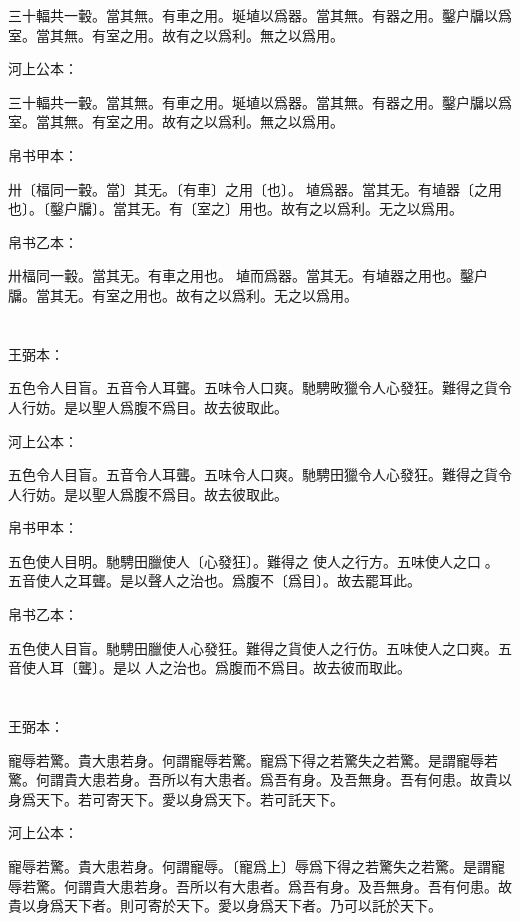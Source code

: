 \documentclass[a5paper]{ctexbook}
\begin{document}
    三十輻共一轂。當其無。有車之用。埏埴以爲器。當其無。有器之用。鑿户牖以爲室。當其無。有室之用。故有之以爲利。無之以爲用。

    河上公本：

    三十輻共一轂。當其無。有車之用。埏埴以爲器。當其無。有器之用。鑿户牖以爲室。當其無。有室之用。故有之以爲利。無之以爲用。

    帛书甲本：

    卅〔楅同一轂。當〕其无。〔有車〕之用〔也〕。𡑋埴爲器。當其无。有埴器〔之用也〕。〔鑿户牖〕。當其无。有〔室之〕用也。故有之以爲利。无之以爲用。

    帛书乙本：

    卅楅同一轂。當其无。有車之用也。𡑋埴而爲器。當其无。有埴器之用也。鑿户牖。當其无。有室之用也。故有之以爲利。无之以爲用。

    \chapter{}
    王弼本：

    五色令人目盲。五音令人耳聾。五味令人口爽。馳騁畋獵令人心發狂。難得之貨令人行妨。是以聖人爲腹不爲目。故去彼取此。

    河上公本：

    五色令人目盲。五音令人耳聾。五味令人口爽。馳騁田獵令人心發狂。難得之貨令人行妨。是以聖人爲腹不爲目。故去彼取此。

    帛书甲本：

    五色使人目明。馳騁田臘使人〔心發狂〕。難得之𧷴使人之行方。五味使人之口𠷹。五音使人之耳聾。是以聲人之治也。爲腹不〔爲目〕。故去罷耳此。

    帛书乙本：

    五色使人目盲。馳騁田臘使人心發狂。難得之貨使人之行仿。五味使人之口爽。五音使人耳〔聾〕。是以𦔻人之治也。爲腹而不爲目。故去彼而取此。

    \chapter{}
    王弼本：

    寵辱若驚。貴大患若身。何謂寵辱若驚。寵爲下得之若驚失之若驚。是謂寵辱若驚。何謂貴大患若身。吾所以有大患者。爲吾有身。及吾無身。吾有何患。故貴以身爲天下。若可寄天下。愛以身爲天下。若可託天下。

    河上公本：

    寵辱若驚。貴大患若身。何謂寵辱。〔寵爲上〕辱爲下得之若驚失之若驚。是謂寵辱若驚。何謂貴大患若身。吾所以有大患者。爲吾有身。及吾無身。吾有何患。故貴以身爲天下者。則可寄於天下。愛以身爲天下者。乃可以託於天下。
\end{document}

